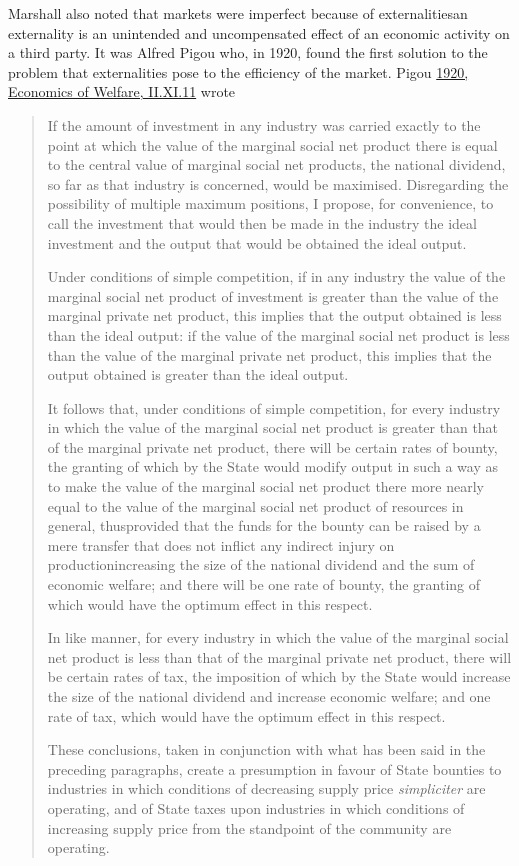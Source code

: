 Marshall also noted that markets were imperfect because of externalities\textemdash an externality is an unintended and uncompensated effect of an economic activity on a third party. It was Alfred Pigou who, in 1920, found the first solution to the problem that externalities pose to the efficiency of the market. Pigou \href{https://www.econlib.org/library/NPDBooks/Pigou/pgEW.html?chapter_num=24#book-reader}{1920, Economics of Welfare, II.XI.11} wrote
\begin{quote}
    If the amount of investment in any industry was carried exactly to the point at which the value of the marginal social net product there is equal to the central value of marginal social net products, the national dividend, so far as that industry is concerned, would be maximised. Disregarding the possibility of multiple maximum positions, I propose, for convenience, to call the investment that would then be made in the industry the ideal investment and the output that would be obtained the ideal output.

    Under conditions of simple competition, if in any industry the value of the marginal social net product of investment is greater than the value of the marginal private net product, this implies that the output obtained is less than the ideal output: if the value of the marginal social net product is less than the value of the marginal private net product, this implies that the output obtained is greater than the ideal output.

    It follows that, under conditions of simple competition, for every industry in which the value of the marginal social net product is greater than that of the marginal private net product, there will be certain rates of bounty, the granting of which by the State would modify output in such a way as to make the value of the marginal social net product there more nearly equal to the value of the marginal social net product of resources in general, thus\textemdash provided that the funds for the bounty can be raised by a mere transfer that does not inflict any indirect injury on production\textemdash increasing the size of the national dividend and the sum of economic welfare; and there will be one rate of bounty, the granting of which would have the optimum effect in this respect.

    In like manner, for every industry in which the value of the marginal social net product is less than that of the marginal private net product, there will be certain rates of tax, the imposition of which by the State would increase the size of the national dividend and increase economic welfare; and one rate of tax, which would have the optimum effect in this respect.
    
    These conclusions, taken in conjunction with what has been said in 
    the preceding paragraphs, create a presumption in favour of State bounties to industries in which conditions of decreasing supply price \textit{simpliciter} are operating, and of State taxes upon industries in which conditions of increasing supply price from the standpoint of the community are operating.
\end{quote}
